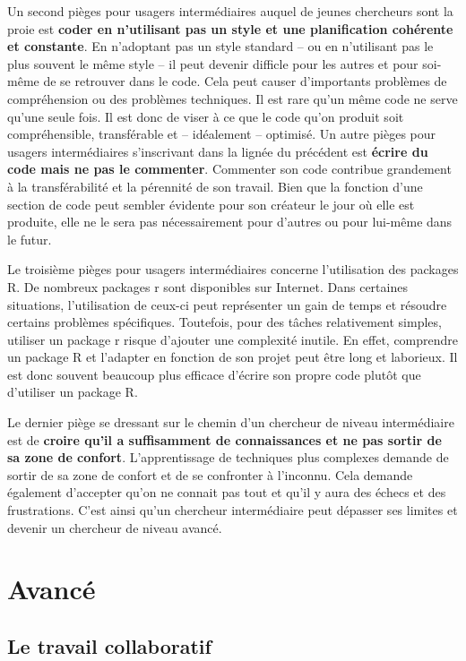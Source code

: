 \documentclass[
  letterpaper,
  DIV=11,
  numbers=noendperiod]{scrreprt}
\begin{document}
Un second pièges pour usagers intermédiaires auquel de jeunes chercheurs
sont la proie est \textbf{coder en n'utilisant pas un style et une
planification cohérente et constante}. En n'adoptant pas un style
standard -- ou en n'utilisant pas le plus souvent le même style -- il
peut devenir difficle pour les autres et pour soi-même de se retrouver
dans le code. Cela peut causer d'importants problèmes de compréhension
ou des problèmes techniques. Il est rare qu'un même code ne serve qu'une
seule fois. Il est donc de viser à ce que le code qu'on produit soit
compréhensible, transférable et -- idéalement -- optimisé. Un autre
pièges pour usagers intermédiaires s'inscrivant dans la lignée du
précédent est \textbf{écrire du code mais ne pas le commenter}.
Commenter son code contribue grandement à la transférabilité et la
pérennité de son travail. Bien que la fonction d'une section de code
peut sembler évidente pour son créateur le jour où elle est produite,
elle ne le sera pas nécessairement pour d'autres ou pour lui-même dans
le futur.

Le troisième pièges pour usagers intermédiaires concerne l'utilisation
des packages R. De nombreux packages r sont disponibles sur Internet.
Dans certaines situations, l'utilisation de ceux-ci peut représenter un
gain de temps et résoudre certains problèmes spécifiques. Toutefois,
pour des tâches relativement simples, utiliser un package r risque
d'ajouter une complexité inutile. En effet, comprendre un package R et
l'adapter en fonction de son projet peut être long et laborieux. Il est
donc souvent beaucoup plus efficace d'écrire son propre code plutôt que
d'utiliser un package R.

Le dernier piège se dressant sur le chemin d'un chercheur de niveau
intermédiaire est de \textbf{croire qu'il a suffisamment de
connaissances et ne pas sortir de sa zone de confort}. L'apprentissage
de techniques plus complexes demande de sortir de sa zone de confort et
de se confronter à l'inconnu. Cela demande également d'accepter qu'on ne
connait pas tout et qu'il y aura des échecs et des frustrations. C'est
ainsi qu'un chercheur intermédiaire peut dépasser ses limites et devenir
un chercheur de niveau avancé.

\section{Avancé}\label{avancuxe9}

\subsection{Le travail collaboratif}\label{le-travail-collaboratif}
\end{document}
